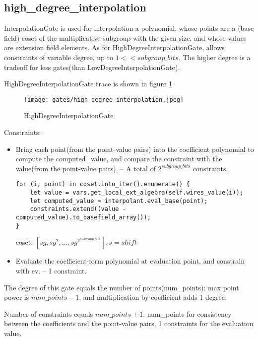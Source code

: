 \subsection{high\_degree\_interpolation}

InterpolationGate is used for interpolation a polynomial, whose points are a (base field) coset of the multiplicative subgroup 
with the given size, and whose values are extension field elements. As for HighDegreeInterpolationGate,  allows constraints of variable degree, 
up to $1<<subgroup\_bits$. The higher degree is a tradeoff for less gates(than LowDegreeInterpolationGate).


HighDegreeInterpolationGate trace is shown in figure \ref{fig:high-degree-interpolation}

\begin{figure}[!ht]
    \centering
    \texttt{[image: gates/high\_degree\_interpolation.jpeg]}
    \caption{HighDegreeInterpolationGate}
    \label{fig:high-degree-interpolation}
\end{figure}


Constraints:
\begin{itemize}
    \item Bring each point(from the point-value pairs) into the coefficient polynomial to compute the computed\_value, 
    and compare the constraint with the value(from the point-value pairs). -- A total of $2^{subgroup\_bits}$ constraints.
    \begin{lstlisting}
for (i, point) in coset.into_iter().enumerate() {
    let value = vars.get_local_ext_algebra(self.wires_value(i));
    let computed_value = interpolant.eval_base(point);
    constraints.extend((value - computed_value).to_basefield_array());
}
    \end{lstlisting}
    coset: $[sg, sg^2,...,sg^{2^{subgroup\_bits}}], s=shift$
    \item Evaluate the coefficient-form polynomial at evaluation point, and constrain with ev. -- 1 constraint.
\end{itemize}

The degree of this gate equals the number of points(num\_points): max point power is $num\_points - 1$, and multiplication by coefficient adds 1 degree.

Number of constraints equals $num\_points + 1$: num\_points for consistency between the coefficients and the point-value pairs, 1 constraints for the evaluation value. 